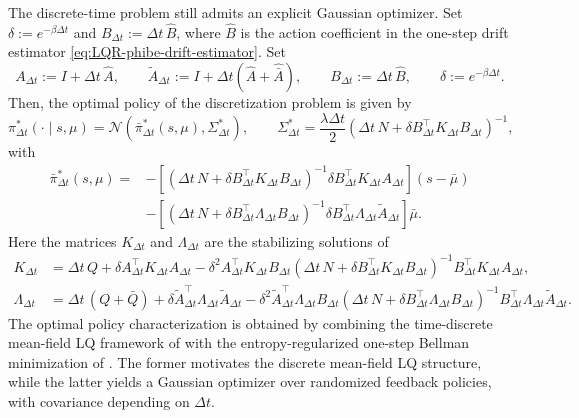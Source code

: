 \documentclass[a4paper, 10pt, english, reqno]{amsart}
\begin{document}
The discrete-time problem still admits an explicit Gaussian optimizer. Set
$\delta:=e^{-\beta\Delta t}$ and $B_{\Delta t}:=\Delta t\,\hat B$, where
$\hat B$ is the action coefficient in the one-step drift estimator
\eqref{eq:LQR-phibe-drift-estimator}. Set
\[
  A_{\Delta t}:=I+\Delta t\,\hat A,
  \qquad
  \widetilde A_{\Delta t}:=I+\Delta t(\hat A+\hat{\bar A}),
  \qquad
  B_{\Delta t}:=\Delta t\,\hat B,
  \qquad
  \delta:=e^{-\beta\Delta t}.
\]
Then, the optimal policy of the
discretization problem is given by
\[
  \pi_{\Delta t}^*(\cdot\mid s,\mu)
  =
  \mathcal N\left(
    \bar{\pi}_{\Delta t}^*(s,\mu),
    \Sigma_{\Delta t}^*
  \right),
  \qquad
  \Sigma_{\Delta t}^*
  =
  \frac{\lambda\Delta t}{2}
  \left(
    \Delta t\,N
    +
    \delta
    B_{\Delta t}^{\top}K_{\Delta t}B_{\Delta t}
  \right)^{-1},
\]
with
\begin{align*}
  \bar{\pi}_{\Delta t}^*(s,\mu)
  =
  &-
  \left[
  \left(
    \Delta t\,N
    +
    \delta
    B_{\Delta t}^{\top}K_{\Delta t}B_{\Delta t}
  \right)^{-1}
  \delta
  B_{\Delta t}^{\top}K_{\Delta t}A_{\Delta t}
  \right](s-\bar\mu)
\\
  &-
  \left[
  \left(
    \Delta t\,N
    +
    \delta
    B_{\Delta t}^{\top}\Lambda_{\Delta t}B_{\Delta t}
  \right)^{-1}
  \delta
  B_{\Delta t}^{\top}\Lambda_{\Delta t}\widetilde A_{\Delta t}
  \right]\bar\mu .
\end{align*}
Here the matrices $K_{\Delta t}$ and $\Lambda_{\Delta t}$ are the stabilizing
solutions of
\begin{align*}
K_{\Delta t}
&=
\Delta t\,Q
+
\delta
A_{\Delta t}^{\top}
K_{\Delta t}
A_{\Delta t}
-
\delta^2
A_{\Delta t}^{\top}
K_{\Delta t}B_{\Delta t}
\left(
  \Delta t\,N
  +
  \delta
  B_{\Delta t}^{\top}K_{\Delta t}B_{\Delta t}
\right)^{-1}
B_{\Delta t}^{\top}K_{\Delta t}
A_{\Delta t},
\\
\Lambda_{\Delta t}
&=
\Delta t\,(Q+\bar Q)
+
\delta
\widetilde A_{\Delta t}^{\top}
\Lambda_{\Delta t}
\widetilde A_{\Delta t}
-
\delta^2
\widetilde A_{\Delta t}^{\top}
\Lambda_{\Delta t}B_{\Delta t}
\left(
  \Delta t\,N
  +
  \delta
  B_{\Delta t}^{\top}\Lambda_{\Delta t}B_{\Delta t}
\right)^{-1}
B_{\Delta t}^{\top}\Lambda_{\Delta t}
\widetilde A_{\Delta t}.
\end{align*}
The optimal policy characterization is obtained by combining the time-discrete mean-field LQ framework of \cite{carmona2019linear} with the entropy-regularized one-step Bellman minimization of \cite{GuoLiXu2025}. The former motivates the discrete mean-field LQ structure, while the latter yields a Gaussian optimizer over randomized feedback policies, with covariance depending on $\Delta t$.
\end{document}

